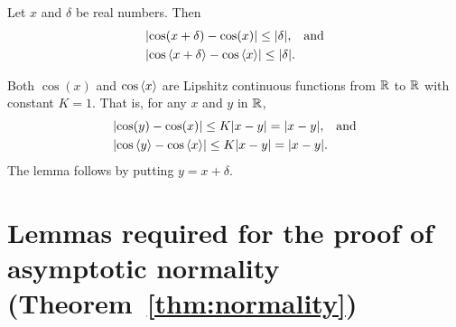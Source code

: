\documentclass[journal]{IEEEtran}
\begin{document}
\begin{lemma}\label{lem:coslipshitz}
Let $x$ and $\delta$ be real numbers.  Then
\begin{align*}
&{\left\vert \cos(x + \delta) - \cos(x) \right\vert} \leq {\left\vert \delta \right\vert}, \;\;\; \text{and} \\
&{\left\vert \cos\left\langle x + \delta \right\rangle - \cos\left\langle x \right\rangle \right\vert} \leq {\left\vert \delta \right\vert}.
\end{align*}
\end{lemma}
\begin{IEEEproof}
Both $\cos(x)$ and $\cos\left\langle x \right\rangle$ are Lipshitz continuous functions from ${\mathbb R}$ to ${\mathbb R}$ with constant $K=1$.  That is, for any $x$ and $y$ in ${\mathbb R}$,
\begin{align*}
&{\left\vert \cos(y) - \cos(x) \right\vert} \leq K{\left\vert x-y \right\vert} = {\left\vert x-y \right\vert}, \;\;\; \text{and} \\
&{\left\vert \cos\left\langle y \right\rangle - \cos\left\langle x \right\rangle \right\vert} \leq K{\left\vert x-y \right\vert} = {\left\vert x-y \right\vert}.
\end{align*}
 The lemma follows by putting $y = x + \delta$.
\end{IEEEproof}

\section{Lemmas required for the proof of asymptotic normality (Theorem~\ref{thm:normality}) } \label{sec:proof-asympt-normappendix}
\end{document}
